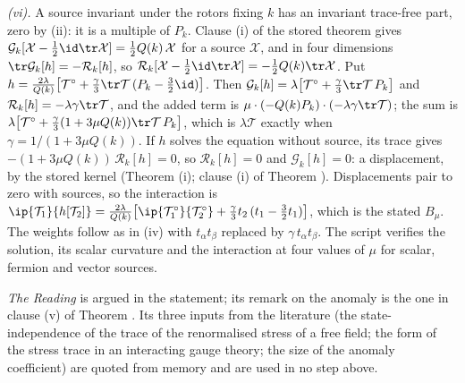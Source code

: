 \emph{(vi).} A source invariant under the rotors fixing $k$ has an invariant trace-free part, zero by (ii): it is a multiple of $P_{k}$. Clause (i) of the stored theorem gives $\mathcal{G}_{k}[\mathcal{X} - \tfrac12\id\tr\mathcal{X}] = \tfrac12 Q(k)\,\mathcal{X}$ for a source $\mathcal{X}$, and in four dimensions $\tr\mathcal{G}_{k}[h] = -\mathcal{R}_{k}[h]$, so $\mathcal{R}_{k}[\mathcal{X} - \tfrac12\id\tr\mathcal{X}] = -\tfrac12 Q(k)\tr\mathcal{X}$. Put $h = \tfrac{2\lambda}{Q(k)}\bigl[\mathcal{T}^{\circ} + \tfrac{\gamma}{3}\tr\mathcal{T}\,(P_{k} - \tfrac32\id)\bigr]$. Then $\mathcal{G}_{k}[h] = \lambda\bigl[\mathcal{T}^{\circ} + \tfrac{\gamma}{3}\tr\mathcal{T}\,P_{k}\bigr]$ and $\mathcal{R}_{k}[h] = -\lambda\gamma\tr\mathcal{T}$, and the added term is $\mu \cdot (-Q(k)P_{k}) \cdot (-\lambda\gamma\tr\mathcal{T})$; the sum is $\lambda\bigl[\mathcal{T}^{\circ} + \tfrac{\gamma}{3}(1 + 3\mu Q(k))\tr\mathcal{T}\,P_{k}\bigr]$, which is $\lambda\mathcal{T}$ exactly when $\gamma = 1/(1 + 3\mu Q(k))$. If $h$ solves the equation without source, its trace gives $-(1 + 3\mu Q(k))\,\mathcal{R}_{k}[h] = 0$, so $\mathcal{R}_{k}[h] = 0$ and $\mathcal{G}_{k}[h] = 0$: a displacement, by the stored kernel (Theorem (i); clause (i) of Theorem ). Displacements pair to zero with sources, so the interaction is $\ip{\mathcal{T}_{1}}{h[\mathcal{T}_{2}]} = \tfrac{2\lambda}{Q(k)}\bigl[\ip{\mathcal{T}_{1}^{\circ}}{\mathcal{T}_{2}^{\circ}} + \tfrac{\gamma}{3}t_{2}\,(t_{1} - \tfrac32 t_{1})\bigr]$, which is the stated $B_{\mu}$. The weights follow as in (iv) with $t_{\alpha}t_{\beta}$ replaced by $\gamma\,t_{\alpha}t_{\beta}$. The script verifies the solution, its scalar curvature and the interaction at four values of $\mu$ for scalar, fermion and vector sources.

\emph{The Reading} is argued in the statement; its remark on the anomaly is the one in clause (v) of Theorem . Its three inputs from the literature (the state-independence of the trace of the renormalised stress of a free field; the form of the stress trace in an interacting gauge theory; the size of the anomaly coefficient) are quoted from memory and are used in no step above.
